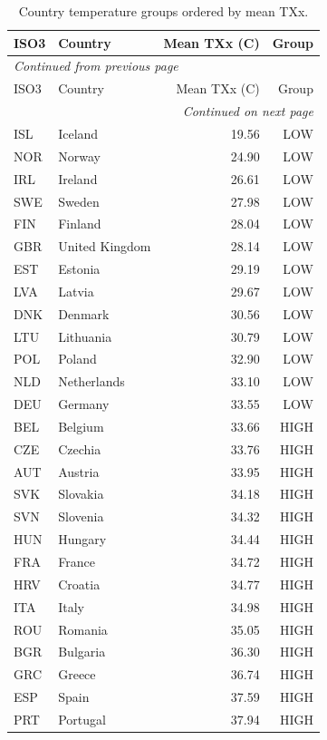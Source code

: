 \documentclass[12pt,a4paper]{article}
\begin{document}
\begin{longtable}{@{}llrr@{}}
\caption{Country temperature groups ordered by mean TXx.}\label{tab:tempgroups}\\
\toprule
ISO3 & Country & Mean TXx (\textdegree{}C) & Group \\
\midrule
\endfirsthead
\multicolumn{4}{l}{\small\textit{Continued from previous page}}\\
\toprule
ISO3 & Country & Mean TXx (\textdegree{}C) & Group \\
\midrule
\endhead
\midrule
\multicolumn{4}{r}{\small\textit{Continued on next page}}\\
\endfoot
\bottomrule
\endlastfoot
ISL & Iceland         & 19.56 & LOW  \\
NOR & Norway          & 24.90 & LOW  \\
IRL & Ireland         & 26.61 & LOW  \\
SWE & Sweden          & 27.98 & LOW  \\
FIN & Finland         & 28.04 & LOW  \\
GBR & United Kingdom  & 28.14 & LOW  \\
EST & Estonia         & 29.19 & LOW  \\
LVA & Latvia          & 29.67 & LOW  \\
DNK & Denmark         & 30.56 & LOW  \\
LTU & Lithuania       & 30.79 & LOW  \\
POL & Poland          & 32.90 & LOW  \\
NLD & Netherlands     & 33.10 & LOW  \\
DEU & Germany         & 33.55 & LOW  \\
\midrule
BEL & Belgium         & 33.66 & HIGH \\
CZE & Czechia         & 33.76 & HIGH \\
AUT & Austria         & 33.95 & HIGH \\
SVK & Slovakia        & 34.18 & HIGH \\
SVN & Slovenia        & 34.32 & HIGH \\
HUN & Hungary         & 34.44 & HIGH \\
FRA & France          & 34.72 & HIGH \\
HRV & Croatia         & 34.77 & HIGH \\
ITA & Italy           & 34.98 & HIGH \\
ROU & Romania         & 35.05 & HIGH \\
BGR & Bulgaria        & 36.30 & HIGH \\
GRC & Greece          & 36.74 & HIGH \\
ESP & Spain           & 37.59 & HIGH \\
PRT & Portugal        & 37.94 & HIGH \\
\end{longtable}
\end{document}
